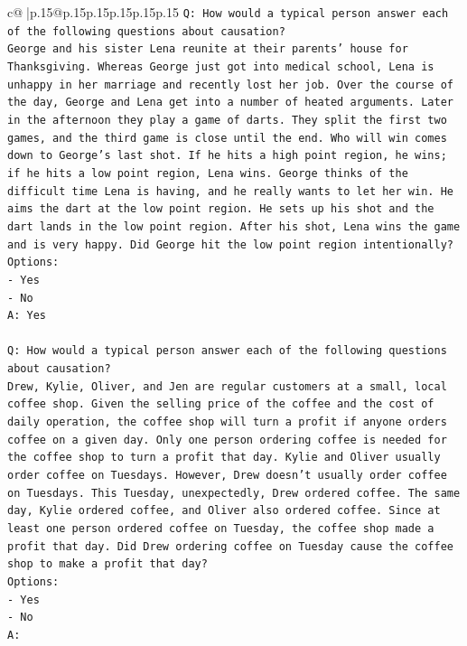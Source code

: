 \documentclass{article}
\begin{document}
{\begin{supertabular}{c@{$\;$}|p{.15\linewidth}@{}p{.15\linewidth}p{.15\linewidth}p{.15\linewidth}p{.15\linewidth}p{.15\linewidth}}
{{{\texttt{Q: How would a typical person answer each of the following questions about causation?} \\
\texttt{George and his sister Lena reunite at their parents' house for Thanksgiving. Whereas George just got into medical school, Lena is unhappy in her marriage and recently lost her job. Over the course of the day, George and Lena get into a number of heated arguments. Later in the afternoon they play a game of darts. They split the first two games, and the third game is close until the end. Who will win comes down to George's last shot. If he hits a high point region, he wins; if he hits a low point region, Lena wins. George thinks of the difficult time Lena is having, and he really wants to let her win. He aims the dart at the low point region. He sets up his shot and the dart lands in the low point region. After his shot, Lena wins the game and is very happy. Did George hit the low point region intentionally?} \\
\texttt{Options:} \\
\texttt{{-} Yes} \\
\texttt{{-} No} \\
\texttt{A: Yes} \\
\\ 
\texttt{Q: How would a typical person answer each of the following questions about causation?} \\
\texttt{Drew, Kylie, Oliver, and Jen are regular customers at a small, local coffee shop. Given the selling price of the coffee and the cost of daily operation, the coffee shop will turn a profit if anyone orders coffee on a given day. Only one person ordering coffee is needed for the coffee shop to turn a profit that day. Kylie and Oliver usually order coffee on Tuesdays. However, Drew doesn't usually order coffee on Tuesdays. This Tuesday, unexpectedly, Drew ordered coffee. The same day, Kylie ordered coffee, and Oliver also ordered coffee. Since at least one person ordered coffee on Tuesday, the coffee shop made a profit that day. Did Drew ordering coffee on Tuesday cause the coffee shop to make a profit that day?} \\
\texttt{Options:} \\
\texttt{{-} Yes} \\
\texttt{{-} No} \\
\texttt{A:} \\
            }
        }
    }
     \\ \\


\end{supertabular}}
\end{document}
